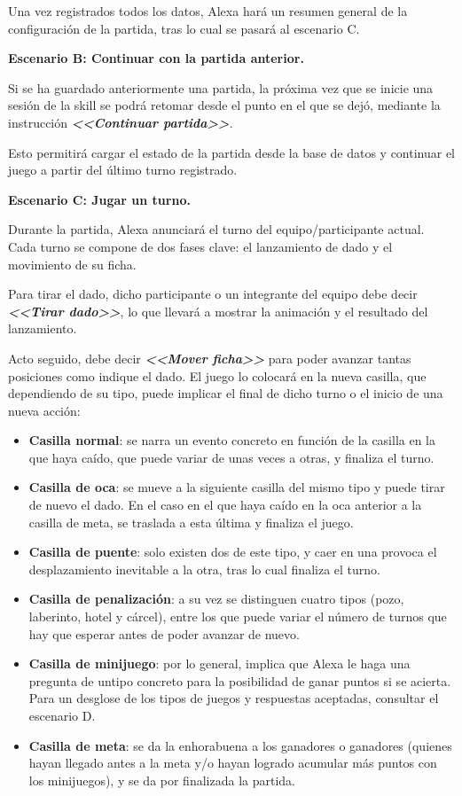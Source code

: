 Una vez registrados todos los datos, Alexa hará un resumen general de la configuración de la partida, tras lo cual se pasará al escenario C.

\vspace{1cm}
\textbf{Escenario B: Continuar con la partida anterior.}

Si se ha guardado anteriormente una partida, la próxima vez que se inicie una sesión de la skill se podrá retomar desde el punto en el que se dejó, mediante la instrucción \textbf{\textit{<<Continuar partida>>}}.

Esto permitirá cargar el estado de la partida desde la base de datos y continuar el juego a partir del último turno registrado.

\vspace{1cm}
\textbf{Escenario C: Jugar un turno.}

Durante la partida, Alexa anunciará el turno del equipo/participante actual. Cada turno se compone de dos fases clave: el lanzamiento de dado y el movimiento de su ficha.

Para tirar el dado, dicho participante o un integrante del equipo debe decir \textbf{\textit{<<Tirar dado>>}}, lo que llevará a mostrar la animación y el resultado del lanzamiento.

Acto seguido, debe decir \textbf{\textit{<<Mover ficha>>}} para poder avanzar tantas posiciones como indique el dado. El juego lo colocará en la nueva casilla, que dependiendo de su tipo, puede implicar el final de dicho turno o el inicio de una nueva acción:
 \begin{itemize}
 	\item \textbf{Casilla normal}: se narra un evento concreto en función de la casilla en la que haya caído, que puede variar de unas veces a otras, y finaliza el turno.
 	\item \textbf{Casilla de oca}: se mueve a la siguiente casilla del mismo tipo y puede tirar de nuevo el dado. En el caso en el que haya caído en la oca anterior a la casilla de meta, se traslada a esta última y finaliza el juego.
 	\item \textbf{Casilla de puente}: solo existen dos de este tipo, y caer en una provoca el desplazamiento inevitable a la otra, tras lo cual finaliza el turno. 
 	\item \textbf{Casilla de penalización}: a su vez se distinguen cuatro tipos (pozo, laberinto, hotel y cárcel), entre los que puede variar el número de turnos que hay que esperar antes de poder avanzar de nuevo.
 	\item \textbf{Casilla de minijuego}: por lo general, implica que Alexa le haga una pregunta de untipo concreto para la posibilidad de ganar puntos si se acierta. Para un desglose de los tipos de juegos y respuestas aceptadas, consultar el escenario D.
 	\item \textbf{Casilla de meta}: se da la enhorabuena a los ganadores o ganadores (quienes hayan llegado antes a la meta y/o hayan logrado acumular más puntos con los minijuegos), y se da por finalizada la partida.
 \end{itemize}

